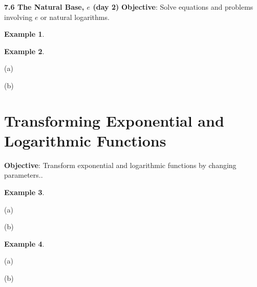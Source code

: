 \documentclass{report}
\theoremstyle{definition}
\newtheorem{example}{\bf Example}
\begin{document}
\noindent \Large \textbf{7.6 The Natural Base, $e$ (day 2)} \normalsize
 \indent\hfill\small\noindent \textbf{Objective}: Solve equations and problems involving $e$ or natural logarithms.\normalsize\\

\begin{example}

\end{example}
\vfill

\begin{example}

\end{example}
(a) 
\vfill

(b) 


\vfill
\noindent{}
 \newpage

 \section{Transforming Exponential and Logarithmic Functions }
 \noindent \hfill\small \noindent \textbf{Objective}: Transform exponential and logarithmic functions by changing parameters.. \normalsize\\
 \setcounter{example}{0}
 \setcounter{definition}{0}

\begin{example}

\end{example}

\begin{minipage}[t]{0.45\linewidth}
(a)  
\end{minipage}
\hfill
\begin{minipage}[t]{0.45\linewidth}
(b) 
\end{minipage}

\vfill

\begin{example}

\end{example}

\begin{minipage}[t]{0.45\linewidth}
(a) 
\end{minipage}
\hfill
\begin{minipage}[t]{0.45\linewidth}
(b) 
\end{minipage}
\end{document}
